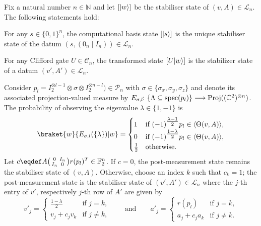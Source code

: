 \documentclass[a4paper, oneside, 12pt]{amsart}
\newcommand*{\PauliGroup}{\ensuremath{\mathcal{P}}}
\begin{document}
\begin{theorem}\label{thm:gottesman-knill}
  Fix a natural number \(n \in \mathbb{N}\) and let \([\lvert w\rangle]\) be the stabiliser state of \((v,A)\in \mathcal{L}_{n}\).
  The following statements hold:
  \begin{thmlist}
    \item  For any \(s\in\{0,1\}^{n}\), the computational basis state \([\lvert s\rangle]\) is the unique stabiliser state of the datum \((s,(0_{n} \mid I_{n})) \in \mathcal{L}_{n}\).
    \item  For any Clifford gate \(U\in \mathcal{C}_{n}\), the transformed state \([U\lvert w\rangle]\) is the stabilizer state of a datum \((v', A') \in \mathcal{L}_{n}\).

    \item Consider  \(p_{l} = I_{2}^{\otimes l-1} \otimes \sigma \otimes I_{2}^{\otimes n-l})\in \PauliGroup_{n}\) with \(\sigma \in \{\sigma_{x}, \sigma_{y}, \sigma_{z}\}\) and denote its associated projection-valued measure by \(E_{\sigma,l} \from \{ \Lambda \subseteq \mathrm{spec}(p_{l})\} \to \mathrm{Proj}((\mathbb{C}^{2})^{\otimes n})\).
    The probability of observing the eigenvalue \(\lambda \in\{1, -1\}\) is
    \begin{equation}\label{eq:Got-Knil-probs}
      \braket{w }{ E_{\sigma,l}(\{\lambda\}) | w} =
      \begin{cases}
        1 & \text{if } (-1)^{\tfrac{\lambda-1}{2}} p_{l} \in \langle \Theta(v,A)\rangle, \\
        0 & \text{if } (-1)^{\tfrac{1-\lambda}{2}} p_{l} \in \langle\Theta(v,A)\rangle, \\
        \tfrac{1}{2} & \text{otherwise.}
      \end{cases}
    \end{equation}
    Let \(c \eqdef A \begin{psmallmatrix} 0 & I_n \\ I_n & 0 \end{psmallmatrix} r(p_{l})^{T} \in \mathbb{F}_{2}^{n}\). If \(c = 0\), the post-measurement state remains the stabiliser state of \((v, A)\).
    Otherwise, choose an index \(k\) such that \(c_k = 1\); the post-measurement state is the stabiliser state of  \((v', A') \in \mathcal{L}_n\) where the \(j\)-th entry of \(v'\), respectively \(j\)-th row of \(A'\) are given by
    \begin{equation}\label{eq:Got-Knil-state-updates}
      v'_j = \begin{cases} \tfrac{1 - \lambda}{2} & \text{if } j = k, \\ v_j + c_j v_k & \text{if } j \neq k, \end{cases}\qquad \text{and} \qquad
      a'_j = \begin{cases} r(p_l) & \text{if } j = k, \\ a_j + c_j a_k & \text{if } j \neq k. \end{cases}
    \end{equation}
  \end{thmlist}
\end{theorem}
\end{document}
